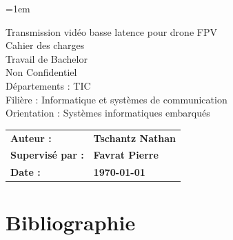 \documentclass[a4paper,12pt]{article}
\begin{document}
\emergencystretch=1em 

\thispagestyle{firstpage}
\vspace*{2cm}
\begin{center}
    \Huge Transmission vidéo basse latence pour drone FPV\\
    \vspace{0.2cm}
    \Huge Cahier des charges\\
    \vspace{0.2cm}
    \Large Travail de Bachelor\\
    \vspace{0.2cm}
    \small Non Confidentiel\\
    \vspace{0.5cm}
    Départements : TIC\\
    \vspace{0.5cm}
    Filière : Informatique et systèmes de communication\\
    \vspace{0.5cm}
    Orientation : Systèmes informatiques embarqués\\
\end{center}

\vspace{9cm}

\renewcommand{\arraystretch}{1.5} %

\begin{flushleft} %
    \begin{tabular}{@{}l l@{}}
        \textbf{Auteur :}      & \textbf{Tschantz Nathan} \\
        \textbf{Supervisé par :}   & \textbf{Favrat Pierre} \\
        \textbf{Date :}         & \textbf{\today} \\
    \end{tabular}
\end{flushleft}

\newpage

\newpage
\tableofcontents %
\newpage
\listoftables     %

\newpage
\pagestyle{otherpages}










\newpage
\section{Bibliographie}
\nocite{*}




%
\end{document}
